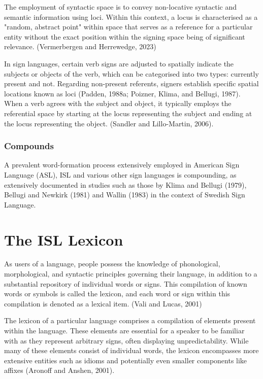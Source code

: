 The employment of syntactic space is to convey non-locative syntactic and semantic information using loci. Within this context, a locus is characterised as a "random, abstract point" within space that serves as a reference for a particular entity without the exact position within the signing space being of significant relevance. (Vermerbergen and Herrewedge, 2023)

In sign languages, certain verb signs are adjusted to spatially indicate the subjects or objects of the verb, which can be categorised into two types: currently present and not. Regarding non-present referents, signers establish specific spatial locations known as loci (Padden, 1988a; Poizner, Klima, and Bellugi, 1987). When a verb agrees with the subject and object, it typically employs the referential space by starting at the locus representing the subject and ending at the locus representing the object. (Sandler and Lillo-Martin, 2006). 


\subsubsection{Compounds} 


A prevalent word-formation process extensively employed in American Sign Language (ASL), ISL and various other sign languages is compounding, as extensively documented in studies such as those by Klima and Bellugi (1979), Bellugi and Newkirk (1981) and Wallin (1983) in the context of Swedish Sign Language.  \\




\section{The ISL Lexicon}


As users of a language, people possess the knowledge of phonological, morphological, and syntactic principles governing their language, in addition to a substantial repository of individual words or signs. This compilation of known words or symbols is called the lexicon, and each word or sign within this compilation is denoted as a lexical item. (Vali and Lucas, 2001)

The lexicon of a particular language comprises a compilation of elements present within the language. These elements are essential for a speaker to be familiar with as they represent arbitrary signs, often displaying unpredictability. While many of these elements consist of individual words, the lexicon encompasses more extensive entities such as idioms and potentially even smaller components like affixes (Aronoff and Anshen, 2001).

